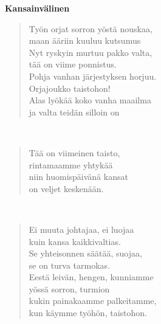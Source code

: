 \noindent\begin{minipage}{\linewidth}
\vspace{5pt}
\parbox[t]{0.85\linewidth}{\raggedright {\large\bf Kansainvälinen}\\[6pt]}
\begin{verse}
	Työn orjat sorron yöstä nouskaa,\\
	maan ääriin kuuluu kutsumus\\
	Nyt ryskyin murtuu pakko valta,\\
	tää on viime ponnistus.\\
	Pohja vanhan järjestyksen horjuu.\\
	Orjajoukko taistohon!\\
	Alas lyökää koko vanha maailma\\
	ja valta teidän silloin on\\
\end{verse}
\end{minipage}\\[10pt]
\noindent\begin{minipage}{\linewidth}
\begin{verse}
	Tää on viimeinen taisto,\\
	rintamaamme yhtykää\\
	niin huomispäivänä kansat\\
	on veljet keskenään.\\
\end{verse}
\end{minipage}\\[10pt]
\noindent\begin{minipage}{\linewidth}
\begin{verse}
	Ei muuta johtajaa, ei luojaa\\
	kuin kansa kaikkivaltias.\\
	Se yhteisonnen säätää, suojaa,\\
	se on turva tarmokas.\\
	Eestä leivän, hengen, kunniamme\\
	yössä sorron, turmion\\
	kukin painakaamme palkeitamme,\\
	kun käymme työhön, taistohon.\\
\end{verse}
\end{minipage}\\[10pt]
